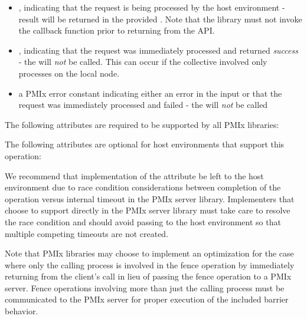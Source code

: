 \begin{itemize}
    \item {}, indicating that the request is being processed by the host environment - result will be returned in the provided . Note that the library must not invoke the callback function prior to returning from the \ac{API}.
    \item {}, indicating that the request was immediately processed and returned \textit{success} - the  will \textit{not} be called. This can occur if the collective involved only processes on the local node.
    \item a PMIx error constant indicating either an error in the input or that the request was immediately processed and failed - the  will \textit{not} be called
\end{itemize}


\reqattrstart
The following attributes are required to be supported by all \ac{PMIx} libraries:


\reqattrend

\optattrstart
The following attributes are optional for host environments that support this operation:


\optattrend

\adviceimplstart
We recommend that implementation of the  attribute be left to the host environment due to race condition considerations between completion of the operation versus internal timeout in the \ac{PMIx} server library. Implementers that choose to support  directly in the \ac{PMIx} server library must take care to resolve the race condition and should avoid passing  to the host environment so that multiple competing timeouts are not created.

Note that \ac{PMIx} libraries may choose to implement an optimization for the case where only the calling process is involved in the fence operation by immediately returning  from the client's call in lieu of passing the fence operation to a \ac{PMIx} server. Fence operations involving more than just the calling process must be communicated to the \ac{PMIx} server for proper execution of the included barrier behavior.

